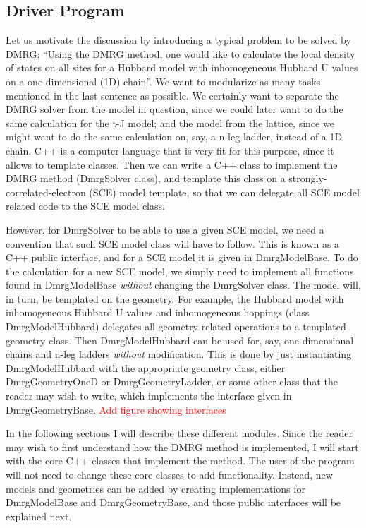 \documentclass[paper=letter]{scrartcl}
\newcommand{\todo}[1]{\textcolor{red}{#1}}
\newcommand{\cppClass}[1]{{\sffamily #1}}
\begin{document}
\subsection{Driver Program}
Let us motivate the discussion by introducing a typical problem to be solved by DMRG: ``Using the DMRG method, 
one would like to calculate the local density of states on all sites for a Hubbard model with
inhomogeneous Hubbard U values on a one-dimensional (1D) chain''.
We want to modularize as many tasks mentioned in the last sentence as possible. We certainly want to separate the DMRG solver from the model in question,
since we could later want to do the same calculation for the t-J model; and
the model from the lattice, since we might want to do the same calculation on, say, a n-leg ladder, instead of a 1D chain.
C++ is a computer language that is very fit for this purpose, since it allows to template classes. 
Then we can write a C++ class to implement the DMRG method (\cppClass{DmrgSolver} class),  and template this class 
on a strongly-correlated-electron (SCE) model template, so that we can delegate all SCE model related code to the SCE model class.

However, for DmrgSolver to be able to use a given SCE model, we need a convention that such SCE model class
will have to follow.
This is known as a C++ public interface, and for a SCE model it is given in  \cppClass{DmrgModelBase}. 
To do the calculation for a new SCE model, we simply need to
 implement all functions found in \cppClass{DmrgModelBase}  \emph{without} changing the \cppClass{DmrgSolver} class. 
The model will, in turn, be templated on the geometry. For example, the Hubbard model  with
inhomogeneous Hubbard U values and inhomogeneous hoppings (class \cppClass{DmrgModelHubbard}) 
delegates all geometry related operations to a templated geometry class.
Then \cppClass{DmrgModelHubbard} can be used for, say, one-dimensional chains and n-leg ladders \emph{without} modification.
This is done by just instantiating
 \cppClass{DmrgModelHubbard} with the appropriate
geometry class, either \cppClass{DmrgGeometryOneD} or 
\cppClass{DmrgGeometryLadder}, or some other class that the reader may wish to write, which implements the interface given in
\cppClass{DmrgGeometryBase}. 
\todo{Add figure showing interfaces}

In the following sections I will describe these different modules. Since the reader
may wish to first understand how the DMRG method is implemented, I will start with the core C++ classes that implement the method.
The user of the program
will not need to change these core classes to add functionality. Instead, new models and geometries can be added by creating implementations
for \cppClass{DmrgModelBase} and \cppClass{DmrgGeometryBase}, and those public interfaces will be explained next.
\end{document}

